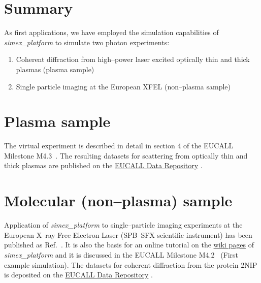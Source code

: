 \documentclass[10pt]{scrartcl}
\begin{document}

\section{Summary}
%
As first applications, we have employed the simulation capabilities of
\textit{simex\_platform} \cite{simex_github} to simulate two photon experiments:
\begin{enumerate}
  \item Coherent diffraction from high--power laser excited optically thin and
    thick plasmas (plasma sample)
  \item Single particle imaging at the European XFEL (non--plasma sample)
\end{enumerate}

\section{Plasma sample}
The virtual experiment is described in detail in section 4 of the EUCALL
Milestone M4.3~\cite{EUCALL_SIMEX_M4.3}. The resulting datasets for scattering
from optically thin and thick plasmas are published on the
\href{https://www.zenodo.org/communities/eucall-data}{EUCALL Data Repository}
\cite{Garten2017.zenodo.885033}.

\section{Molecular (non--plasma) sample}
Application of \textit{simex\_platform} to single--particle imaging experiments
at the European X--ray Free Electron Laser (SPB--SFX scientific instrument) has
been published as Ref.~\cite{Fortmann-Grote2017}. It is also the basis for an
online tutorial on the
\href{https://www.github.com/eucall-software/simex_platform/wiki/SimEx-Tutorial}{wiki
pages} of \textit{simex\_platform} and it is
discussed in the EUCALL Milestone M4.2~\cite{EUCALL_SIMEX_M4.2} (First example
simulation).
The datasets for coherent diffraction from the protein 2NIP is deposited on
the \href{https://www.zenodo.org/communities/eucall-data}{EUCALL Data
Repository} \cite{Fortmann-Grote2017.zenodo.886087}.


\printbibliography
\end{document}
